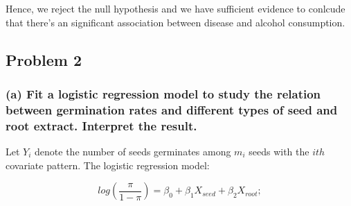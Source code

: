 \documentclass[
]{article}
\begin{document}
Hence, we reject the null hypothesis and we have sufficient evidence to
conlcude that there's an significant association between disease and
alcohol consumption.

\hypertarget{problem-2}{%
\subsection{Problem 2}\label{problem-2}}

\hypertarget{a-fit-a-logistic-regression-model-to-study-the-relation-between-germination-rates-and-different-types-of-seed-and-root-extract.-interpret-the-result.}{%
\subsubsection{(a) Fit a logistic regression model to study the relation
between germination rates and different types of seed and root extract.
Interpret the
result.}\label{a-fit-a-logistic-regression-model-to-study-the-relation-between-germination-rates-and-different-types-of-seed-and-root-extract.-interpret-the-result.}}

Let \(Y_i\) denote the number of seeds germinates among \(m_i\) seeds
with the \(ith\) covariate pattern. The logistic regression model:

\[log(\frac{\pi}{1-\pi}) = \beta_0 + \beta_1X_{seed}+\beta_2X_{root};\]
\end{document}

